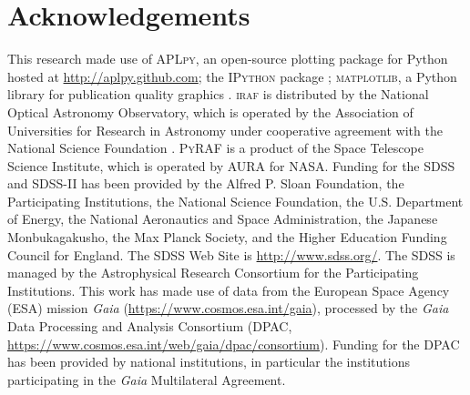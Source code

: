 \documentclass[apj, revtex4]{emulateapj}
\begin{document}
\section*{Acknowledgements} This research made use of \textsc{APLpy}, an open-source plotting package for Python hosted at \url{http://aplpy.github.com}; the \textsc{IPython} package \citep{Perez2007}; \textsc{matplotlib}, a Python library for publication quality graphics \citep{Hunter2007}. \textsc{iraf} is distributed by the National Optical Astronomy Observatory, which is operated by the Association of Universities for Research in Astronomy under cooperative agreement with the National Science Foundation \citep{Tody1993}. \textsc{PyRAF} is a product of the Space Telescope Science Institute, which is operated by AURA for NASA. Funding for the SDSS and SDSS-II has been provided by the Alfred P. Sloan Foundation, the Participating Institutions, the National Science Foundation, the U.S. Department of Energy, the National Aeronautics and Space Administration, the Japanese Monbukagakusho, the Max Planck Society, and the Higher Education Funding Council for England. The SDSS Web Site is \url{http://www.sdss.org/}. The SDSS is managed by the Astrophysical Research Consortium for the Participating Institutions. This work has made use of data from the European Space Agency (ESA) mission {\it Gaia} (\url{https://www.cosmos.esa.int/gaia}), processed by the {\it Gaia} Data Processing and Analysis Consortium (DPAC, \url{https://www.cosmos.esa.int/web/gaia/dpac/consortium}). Funding for the DPAC has been provided by national institutions, in particular the institutions participating in the {\it Gaia} Multilateral Agreement.





\appendix
\end{document}

